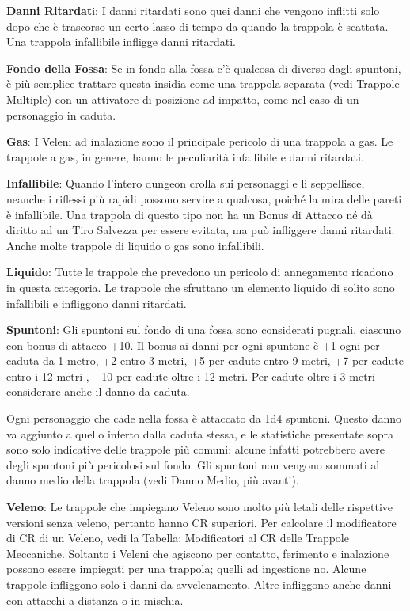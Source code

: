 \documentclass[a4paper,11pt,twoside,openany]{book}
\begin{document}
{\textbf{Danni Ritardat}i: I danni ritardati sono quei danni che vengono inflitti solo dopo che è trascorso un certo lasso di tempo da quando la trappola è scattata. Una trappola infallibile infligge danni ritardati. 

\textbf{Fondo della Fossa}: Se in fondo alla fossa c'è qualcosa di diverso dagli spuntoni, è più semplice trattare questa insidia come una trappola separata (vedi Trappole Multiple) con un attivatore di posizione ad impatto, come nel caso di un personaggio in caduta. 

\textbf{Gas}: I Veleni ad inalazione sono il principale pericolo di una trappola a gas. Le trappole a gas, in genere, hanno le peculiarità infallibile e danni ritardati.

\textbf{Infallibile}: Quando l'intero dungeon crolla sui personaggi e li seppellisce, neanche i riflessi più rapidi possono servire a qualcosa, poiché la mira delle pareti è infallibile. Una trappola di questo tipo non ha un Bonus di Attacco né dà diritto ad un Tiro Salvezza per essere evitata, ma può infliggere danni ritardati. Anche molte trappole di liquido o gas sono infallibili.

\textbf{Liquido}: Tutte le trappole che prevedono un pericolo di annegamento ricadono in questa categoria. Le trappole che sfruttano un elemento liquido di solito sono infallibili e infliggono danni ritardati. 

\textbf{Spuntoni}: Gli spuntoni sul fondo di una fossa sono considerati pugnali, ciascuno con bonus di attacco +10. Il bonus ai danni per ogni spuntone è +1 ogni per caduta da 1 metro, +2 entro 3 metri, +5 per cadute entro 9 metri, +7 per cadute entro i 12 metri , +10 per cadute oltre i 12 metri. Per cadute oltre i 3 metri considerare anche il danno da caduta.

Ogni personaggio che cade nella fossa è attaccato da 1d4 spuntoni. Questo danno va aggiunto a quello inferto dalla caduta stessa, e le statistiche presentate sopra sono solo indicative delle trappole più comuni: alcune infatti potrebbero avere degli spuntoni più pericolosi sul fondo. Gli spuntoni non vengono sommati al danno medio della trappola (vedi Danno Medio, più avanti).

\textbf{Veleno}: Le trappole che impiegano Veleno sono molto più letali delle rispettive versioni senza veleno, pertanto hanno CR superiori. Per calcolare il modificatore di CR di un Veleno, vedi la Tabella: Modificatori al CR delle Trappole Meccaniche. Soltanto i Veleni che agiscono per contatto, ferimento e inalazione possono essere impiegati per una trappola; quelli ad ingestione no. Alcune trappole infliggono solo i danni da avvelenamento. Altre infliggono anche danni con attacchi a distanza o in mischia.

}
\end{document}
